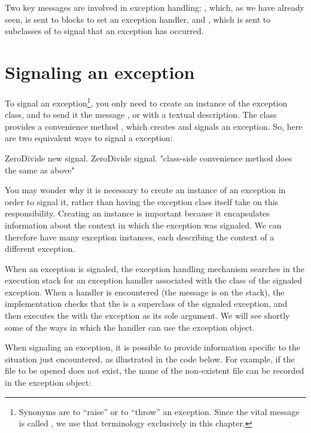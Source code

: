 \documentclass[a4paper,10pt,twoside]{book}
\begin{document}
Two key messages are involved in exception handling: , which, as we have already seen, is sent to blocks to set an exception handler, and , which is sent to subclasses of  to signal that an exception has occurred.

\section{Signaling an exception}

To signal an exception\footnote{Synonyms are to ``raise'' or to ``throw'' an exception. Since the vital message is called , we use that terminology exclusively in this chapter.}, you only need to create an instance of the exception class, and to send it the message , or  with a textual description. The class  provides a convenience method , which creates and signals an exception. So, here are two equivalent ways to signal a  exception:
\begin{code}{}
	ZeroDivide new signal.
	ZeroDivide signal.    "class-side convenience method does the same as above"
\end{code}

You may wonder why it is necessary to create an instance of an exception in order to signal it, rather than having the exception class itself take on this responsibility. Creating an instance is important because it encapsulates information about the context in which the exception was signaled. We can therefore have many exception instances, each describing the context of a different exception.

When an exception is signaled, the exception handling mechanism searches in the execution stack for an exception handler associated with the class of the signaled exception. When a handler is encountered (\ie the message  is on the stack),
the implementation checks that the  is a superclass of the signaled exception, and then executes the  with the exception as its sole argument. We will see shortly some of the ways in which the handler can use the exception object.

When signaling an exception, it is possible to provide information specific to the situation just encountered, as illustrated in the code below. 
For example, if the file to be opened does not exist, the name of the non-existent file can be recorded in the exception object:
\end{document}
